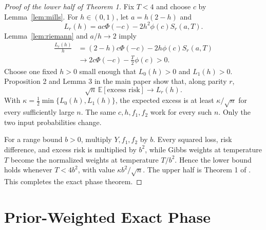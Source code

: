 \documentclass[twoside]{article}
\newcommand{\E}{\mathbb E}
\begin{document}
\begin{proof}[Proof of the lower half of Theorem 1]
Fix $T<4$ and choose $c$ by Lemma~\ref{lem:mills}. For $h\in(0,1)$, let $a=h(2-h)$ and
\[
L_r(h)=ac\Phi(-c)-2h^2\phi(c)S_r(a,T).
\]
Lemma~\ref{lem:riemann} and $a/h\to2$ imply
\begin{align*}
\frac{L_r(h)}h
&=(2-h)c\Phi(-c)
-2h\phi(c)S_r(a,T)\\
&\longrightarrow2c\Phi(-c)-\frac{T}{2}\phi(c)>0.
\end{align*}
Choose one fixed $h>0$ small enough that $L_0(h)>0$ and $L_1(h)>0$. Proposition 2 and Lemma 3 in the main paper show that, along parity $r$,
\[
\sqrt n\,\E[\text{excess risk}]\longrightarrow L_r(h).
\]
With $\kappa=\frac12\min\{L_0(h),L_1(h)\}$, the expected excess is at least $\kappa/\sqrt n$ for every sufficiently large $n$. The same $c,h,f_1,f_2$ work for every such $n$. Only the two input probabilities change.

For a range bound $b>0$, multiply $Y,f_1,f_2$ by $b$. Every squared loss, risk difference, and excess risk is multiplied by $b^2$, while Gibbs weights at temperature $T$ become the normalized weights at temperature $T/b^2$. Hence the lower bound holds whenever $T<4b^2$, with value $\kappa b^2/\sqrt n$. The upper half is Theorem 1 of \citet{hogsgaard2026aggregation}. This completes the exact phase theorem.
\end{proof}

\section{Prior-Weighted Exact Phase}
\end{document}
